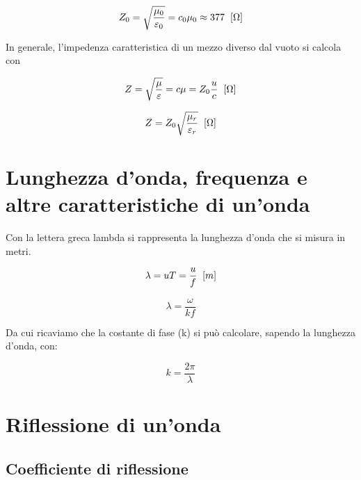 \documentclass{article}
\begin{document}
    \begin{equation}
        Z_0 = \sqrt{\frac{\mu_0}{\varepsilon_0}} = c_0 \mu_0 \approx 377 \hspace{0.2cm} [\Omega]
    \end{equation}

    In generale, l'impedenza caratteristica di un mezzo diverso dal vuoto si calcola con

    \begin{equation}
        Z = \sqrt{\frac{\mu}{\varepsilon}} = c \mu = Z_0 \frac{u}{c} \hspace{0.2cm} [\Omega]
    \end{equation}

    \begin{equation}
        Z = Z_0 \sqrt{\frac{\mu_r}{\varepsilon_r}} \hspace{0.2cm} [\Omega]
    \end{equation}

    \section{Lunghezza d'onda, frequenza e altre caratteristiche di un'onda}

    Con la lettera greca lambda si rappresenta la lunghezza d'onda che si misura in metri.

    \begin{equation}
        \lambda = u T = \frac{u}{f} \hspace{0.2cm} [m]
    \end{equation}

    \begin{equation}
        \lambda = \frac{\omega}{k f}
    \end{equation}

    Da cui ricaviamo che la costante di fase (k) si può calcolare, sapendo la lunghezza d'onda, con:

    \begin{equation}
        k = \frac{2 \pi}{\lambda}
    \end{equation}

    \section{Riflessione di un'onda}

    \subsection{Coefficiente di riflessione}
\end{document}
